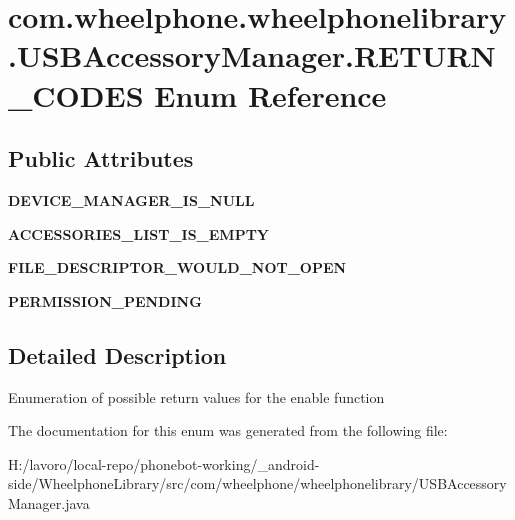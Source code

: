 \section{com.\-wheelphone.\-wheelphonelibrary.\-U\-S\-B\-Accessory\-Manager.\-R\-E\-T\-U\-R\-N\-\_\-\-C\-O\-D\-E\-S \-Enum \-Reference}
\label{enumcom_1_1wheelphone_1_1wheelphonelibrary_1_1_u_s_b_accessory_manager_1_1_r_e_t_u_r_n___c_o_d_e_s}
\subsection*{\-Public \-Attributes}
\begin{DoxyCompactItemize}
\item 
{\bfseries \-D\-E\-V\-I\-C\-E\-\_\-\-M\-A\-N\-A\-G\-E\-R\-\_\-\-I\-S\-\_\-\-N\-U\-L\-L}\label{enumcom_1_1wheelphone_1_1wheelphonelibrary_1_1_u_s_b_accessory_manager_1_1_r_e_t_u_r_n___c_o_d_e_s_af5674f2d197e74a2b5ef5e62839256cb}

\item 
{\bfseries \-A\-C\-C\-E\-S\-S\-O\-R\-I\-E\-S\-\_\-\-L\-I\-S\-T\-\_\-\-I\-S\-\_\-\-E\-M\-P\-T\-Y}\label{enumcom_1_1wheelphone_1_1wheelphonelibrary_1_1_u_s_b_accessory_manager_1_1_r_e_t_u_r_n___c_o_d_e_s_a37f381da5ed24339a196a47ff7a20f42}

\item 
{\bfseries \-F\-I\-L\-E\-\_\-\-D\-E\-S\-C\-R\-I\-P\-T\-O\-R\-\_\-\-W\-O\-U\-L\-D\-\_\-\-N\-O\-T\-\_\-\-O\-P\-E\-N}\label{enumcom_1_1wheelphone_1_1wheelphonelibrary_1_1_u_s_b_accessory_manager_1_1_r_e_t_u_r_n___c_o_d_e_s_a618d51cfb06121c719933aec51ede730}

\item 
{\bfseries \-P\-E\-R\-M\-I\-S\-S\-I\-O\-N\-\_\-\-P\-E\-N\-D\-I\-N\-G}\label{enumcom_1_1wheelphone_1_1wheelphonelibrary_1_1_u_s_b_accessory_manager_1_1_r_e_t_u_r_n___c_o_d_e_s_a277fe4d0361ab50c36b828af95d9e53e}

\end{DoxyCompactItemize}


\subsection{\-Detailed \-Description}
\-Enumeration of possible return values for the enable function 

\-The documentation for this enum was generated from the following file\-:\begin{DoxyCompactItemize}
\item 
\-H\-:/lavoro/local-\/repo/phonebot-\/working/\-\_\-android-\/side/\-Wheelphone\-Library/src/com/wheelphone/wheelphonelibrary/\-U\-S\-B\-Accessory\-Manager.\-java\end{DoxyCompactItemize}
